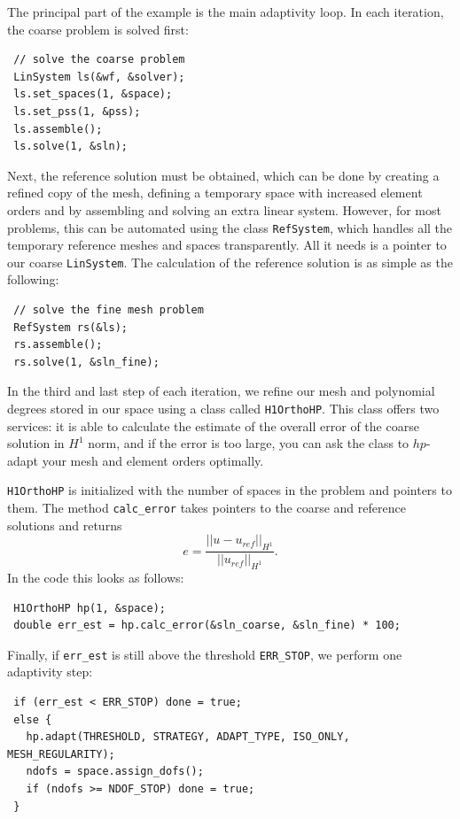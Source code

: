 \documentclass[11pt]{article}
\begin{document}
The principal part of the example is the main adaptivity loop. In each iteration, the coarse problem
is solved first:
\begin{lstlisting}
 // solve the coarse problem
 LinSystem ls(&wf, &solver);
 ls.set_spaces(1, &space);
 ls.set_pss(1, &pss);
 ls.assemble();
 ls.solve(1, &sln);
\end{lstlisting}

Next, the reference solution must be obtained, which can be done by creating a refined copy of the mesh,
defining a temporary space with increased element orders and by assembling and solving an extra
linear system. However, for most problems, this can be automated using the class {\tt RefSystem}, which
handles all the temporary reference meshes and spaces transparently. All it needs is a pointer to our coarse
{\tt LinSystem}. The calculation of the reference solution is as simple as the following:
\begin{lstlisting}
 // solve the fine mesh problem
 RefSystem rs(&ls);
 rs.assemble();
 rs.solve(1, &sln_fine);
\end{lstlisting}

In the third and last step of each iteration, we refine our mesh and polynomial degrees stored
in our space using a class called {\tt H1OrthoHP}. This class offers two services: it is able to
calculate  the estimate of the overall error of the coarse solution in $H^1$ norm, and if the
error is too large, you can ask the class to $hp$-adapt your mesh and element orders optimally.

{\tt H1OrthoHP} is initialized with the number of spaces in the problem and pointers to them.
The method \verb"calc_error" takes pointers to the coarse and reference solutions and returns
$$e = \frac{|| u - u_{ref} ||_{H^1}}{|| u_{ref} ||_{H^1}}.$$
In the code this looks as follows:
\begin{lstlisting}
 H1OrthoHP hp(1, &space);
 double err_est = hp.calc_error(&sln_coarse, &sln_fine) * 100;
\end{lstlisting}

Finally, if {\tt err\_est} is still above the threshold {\tt ERR\_STOP}, we perform one
adaptivity step:

\begin{lstlisting}
 if (err_est < ERR_STOP) done = true;
 else {
   hp.adapt(THRESHOLD, STRATEGY, ADAPT_TYPE, ISO_ONLY, MESH_REGULARITY);
   ndofs = space.assign_dofs();
   if (ndofs >= NDOF_STOP) done = true;
 }
\end{lstlisting}
\end{document}
